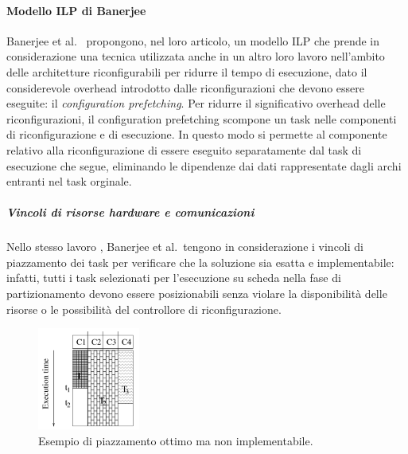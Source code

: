 \paragraph{Modello \acs{ILP} di Banerjee}
Banerjee et al.~\cite{BanerjeePhysicalConstraints} propongono, nel loro 
articolo, un modello \ac{ILP} che prende in considerazione una 
tecnica utilizzata anche in un altro loro lavoro 
\cite{BanerjeeReconfigurationOverhead}nell'ambito delle architetture 
riconfigurabili per ridurre il tempo di esecuzione, dato il considerevole 
overhead introdotto dalle riconfigurazioni che devono essere eseguite: il 
\emph{configuration prefetching}. Per ridurre il significativo overhead delle 
riconfigurazioni, il configuration prefetching scompone un task nelle componenti 
di riconfigurazione e di esecuzione. In questo modo si permette al componente 
relativo alla riconfigurazione di essere eseguito separatamente dal task di 
esecuzione che segue, eliminando le dipendenze dai dati rappresentate dagli 
archi entranti nel task orginale.

\subparagraph{Vincoli di risorse hardware e comunicazioni}
Nello stesso lavoro \cite{BanerjeePhysicalConstraints}, Banerjee et al.~tengono 
in considerazione i vincoli di piazzamento dei task per verificare che la 
soluzione sia esatta e implementabile: infatti, tutti i task selezionati per 
l'esecuzione su scheda nella fase di partizionamento devono essere 
posizionabili senza violare la disponibilità delle risorse o le possibilità del 
controllore di riconfigurazione.

\begin{figure}[!htb]
 \begin{center}
  \includegraphics[width=0.3\textwidth]
{./capitoli/figure/cap2/InfeasiblePlacement.pdf}
\caption[Piazzamento ottimo non implementabile]{Esempio di piazzamento ottimo 
ma non implementabile\footnotemark.}
\label{fig:infeasiblePlacement}
 \end{center}
\end{figure}


